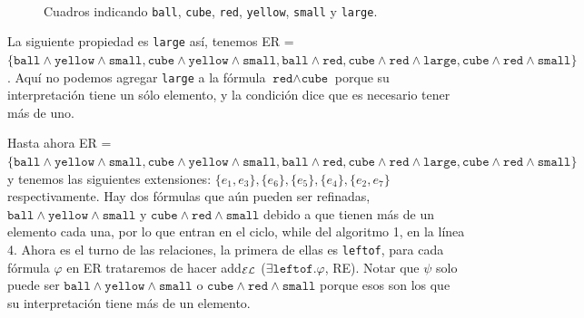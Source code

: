 \begin{figure}[ht]
\begin{center}
\\[0pt]
\caption{Cuadros indicando \texttt{ball}, \texttt{cube}, \texttt{red}, \texttt{yellow}, \texttt{small} y \texttt{large}.}
\label{fig-modelo11}
\end{center}
\end{figure}

La siguiente propiedad es \texttt{large} as\'i, tenemos ER = $\{\texttt{ball} \wedge \texttt{yellow} \wedge \texttt{small}, \texttt{cube} \wedge \texttt{yellow} \wedge \texttt{small}, \texttt{ball} \wedge \texttt{red}, \texttt{cube} \wedge \texttt{red} \wedge \texttt{large}, \texttt{cube} \wedge \texttt{red} \wedge \texttt{small}\}$. Aqu\'i no podemos agregar \texttt{large} a la f\'ormula $\texttt{red} \wedge \texttt{cube}$ porque su interpretaci\'on tiene un s\'olo elemento, y la condici\'on dice que es necesario tener m\'as de uno.

Hasta ahora ER = $\{\texttt{ball} \wedge \texttt{yellow} \wedge \texttt{small}, \texttt{cube} \wedge \texttt{yellow} \wedge \texttt{small}, \texttt{ball} \wedge \texttt{red}, \texttt{cube} \wedge \texttt{red} \wedge \texttt{large}, \texttt{cube} \wedge \texttt{red} \wedge \texttt{small}\}$ 
y tenemos las siguientes extensiones: $\{e_1, e_3\}, \{e_6\}, \{e_5\}, \{e_4\}, \{e_2, e_7\}$ respectivamente. 
Hay dos f\'ormulas que a\'un pueden ser refinadas, $\texttt{ball} \wedge \texttt{yellow} \wedge \texttt{small}$ y $\texttt{cube} \wedge \texttt{red} \wedge \texttt{small}$ 
debido a que tienen m\'as de un elemento cada una, por lo que entran en el ciclo, while del algoritmo 1, en la l\'inea 4. Ahora es el turno de las relaciones, la primera de ellas es \texttt{leftof}, para cada f\'ormula $\varphi$ en ER trataremos de hacer add$_\mathcal{EL}$ ($\exists \texttt{leftof}.\varphi$, RE). Notar que $\psi$ solo puede ser $\texttt{ball} \wedge \texttt{yellow} \wedge \texttt{small}$ o $\texttt{cube} \wedge \texttt{red} \wedge \texttt{small}$ porque esos son los que su interpretaci\'on tiene m\'as de un elemento. 


